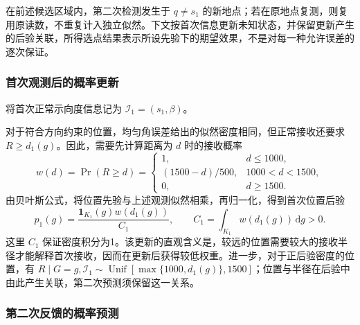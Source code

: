 \documentclass[UTF8,a4paper,zihao=-4,fontset=none]{ctexart}
\begin{document}
在前述候选区域内，第二次检测发生于 \(q\ne s_1\) 的新地点；若在原地点复测，则复用原读数，不重复计入独立似然。下文按首次信息更新未知状态，并保留更新产生的后验关联，所得选点结果表示所设先验下的期望效果，不是对每一种允许误差的逐次保证。

\subsubsection{首次观测后的概率更新}

将首次正常示向度信息记为 \(\mathcal I_1=(s_1,\beta)\)。

对于符合方向约束的位置，均匀角误差给出的似然密度相同，但正常接收还要求 \(R\ge d_1(g)\)。因此，需要先计算距离为 \(d\) 时的接收概率
\begin{equation}
 w(d)=\Pr(R\ge d)=
 \begin{cases}
 1,&d\le1000,\\
 (1500-d)/500,&1000<d<1500,\\
 0,&d\ge1500.
 \end{cases}
\label{eq:q2-pair-weight}
\end{equation}
由贝叶斯公式，将位置先验与上述观测似然相乘，再归一化，得到首次位置后验
\begin{equation}
 p_1(g)=\frac{\mathbf1_{K_1}(g)w(d_1(g))}{C_1},
 \qquad C_1=\int_{K_1}w(d_1(g))\,\mathrm dg>0.
\label{eq:q2-pair-posterior}
\end{equation}
这里 \(C_1\) 保证密度积分为1。该更新的直观含义是，较远的位置需要较大的接收半径才能解释首次接收，因而在更新后获得较低权重。进一步，对于正后验密度的位置，有 \(R\mid G=g,\mathcal I_1\sim\operatorname{Unif}[\max\{1000,d_1(g)\},1500]\)；位置与半径在后验中由此产生关联，第二次预测须保留这一关系。

\subsubsection{第二次反馈的概率预测}
\end{document}
